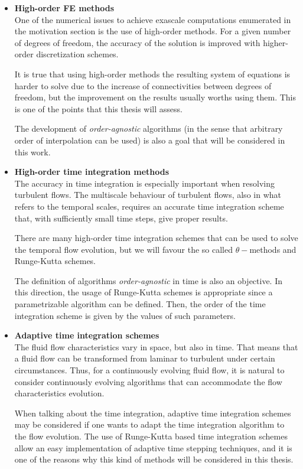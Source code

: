 \begin{itemize}
\item {\bf High-order FE methods}\\
One of the numerical issues to achieve exascale computations enumerated in the motivation section is the use of high-order methods. For a given number of degrees of freedom, the accuracy of the solution is improved with higher-order discretization schemes. 

It is true that using high-order methods the resulting system of equations is harder to solve due to the increase of connectivities between degrees of freedom, but the improvement on the results usually worths using them. This is one of the points that this thesis will assess.

The development of \textit{order-agnostic} algorithms (in the sense that arbitrary order of interpolation can be used) is also a goal that will be considered in this work.

\item {\bf High-order time integration methods}\\
The accuracy in time integration is especially important when resolving turbulent flows. The multiscale behaviour of turbulent flows, also in what refers to the temporal scales, requires an accurate time integration scheme that, with sufficiently small time steps, give proper results.

There are many high-order time integration schemes that can be used to solve the temporal flow evolution, but we will favour the so called $ \theta- $methods and Runge-Kutta schemes.

The definition of algorithms \textit{order-agnostic} in time is also an objective. In this direction, the usage of Runge-Kutta schemes is appropriate since a parametrizable algorithm can be defined. Then, the order of the time integration scheme is given by the values of such parameters.

\item {\bf Adaptive time integration schemes}\\
The fluid flow characteristics vary in space, but also in time. That means that a fluid flow can be transformed from laminar to turbulent under certain circumstances. Thus, for a continuously evolving fluid flow, it is natural to consider continuously evolving algorithms that can accommodate the flow characteristics evolution. 

When talking about the time integration, adaptive time integration schemes may be considered if one wants to adapt the time integration algorithm to the flow evolution. The use of Runge-Kutta based time integration schemes allow an easy implementation of adaptive time stepping techniques, and it is one of the reasons why this kind of methods will be considered in this thesis.


\end{itemize}
